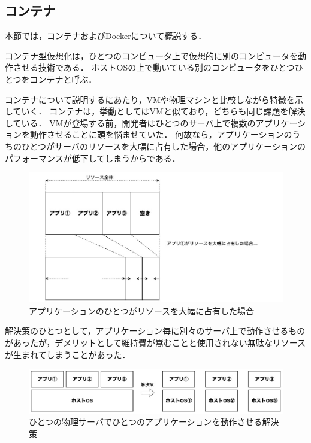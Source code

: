 \subsection{コンテナ}
\label{background:container-orchestration-system:container}

本節では，コンテナおよびDockerについて概説する．

コンテナ型仮想化は，ひとつのコンピュータ上で仮想的に別のコンピュータを動作させる技術である．
ホストOSの上で動いている別のコンピュータをひとつひとつをコンテナと呼ぶ．

コンテナについて説明するにあたり，VMや物理マシンと比較しながら特徴を示していく．
コンテナは，挙動としてはVMと似ており，どちらも同じ課題を解決している．
VMが登場する前，開発者はひとつのサーバ上で複数のアプリケーションを動作させることに頭を悩ませていた．
何故なら，アプリケーションのうちのひとつがサーバのリソースを大幅に占有した場合，他のアプリケーションのパフォーマンスが低下してしまうからである．

\begin{figure}[htbp]
\begin{center}
    \includegraphics[width=\textwidth]{./figures/resource-on-physical-server.jpg}
    \caption{アプリケーションのひとつがリソースを大幅に占有した場合}
\end{center}
\end{figure}

解決策のひとつとして，アプリケーション毎に別々のサーバ上で動作させるものがあったが，デメリットとして維持費が嵩むことと使用されない無駄なリソースが生まれてしまうことがあった．

\begin{figure}[htbp]
\begin{center}
    \includegraphics[width=\textwidth]{./figures/only-on-physical-server.jpg}
    \caption{ひとつの物理サーバでひとつのアプリケーションを動作させる解決策}
\end{center}
\end{figure}

